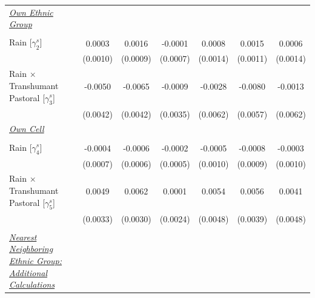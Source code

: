 {\begin{tabular}{l*{6}{c}}
\addlinespace
\underline{\emph{Own Ethnic Group}} \vspace{-0.4cm}&               &               &               &               &               &               \\
                    &               &               &               &               &               &               \\
\addlinespace
\hspace{15pt} Rain [$\gamma^{s}_{2}$]&0.0003         &0.0016\sym{*}  &-0.0001         &0.0008         &0.0015         &0.0006         \\
                    &(0.0010)         &(0.0009)         &(0.0007)         &(0.0014)         &(0.0011)         &(0.0014)         \\
\addlinespace
\hspace{15pt} Rain $\times$ Transhumant Pastoral [$\gamma^{s}_{3}$]&-0.0050         &-0.0065         &-0.0009         &-0.0028         &-0.0080         &-0.0013         \\
                    &(0.0042)         &(0.0042)         &(0.0035)         &(0.0062)         &(0.0057)         &(0.0062)         \\
\addlinespace
\underline{\emph{Own Cell}} \vspace{-0.4cm}&               &               &               &               &               &               \\
                    &               &               &               &               &               &               \\
\addlinespace
\hspace{15pt} Rain [$\gamma^{s}_{4}$]&-0.0004         &-0.0006         &-0.0002         &-0.0005         &-0.0008         &-0.0003         \\
                    &(0.0007)         &(0.0006)         &(0.0005)         &(0.0010)         &(0.0009)         &(0.0010)         \\
\addlinespace
\hspace{15pt} Rain $\times$ Transhumant Pastoral [$\gamma^{s}_{5}$]&0.0049         &0.0062\sym{**} &0.0001         &0.0054         &0.0056         &0.0041         \\
                    &(0.0033)         &(0.0030)         &(0.0024)         &(0.0048)         &(0.0039)         &(0.0048)         \\
\midrule
\\ \underline{\emph{Nearest Neighboring Ethnic Group: Additional Calculations}} &               &               &               &               &               &               \\

\end{tabular}}
